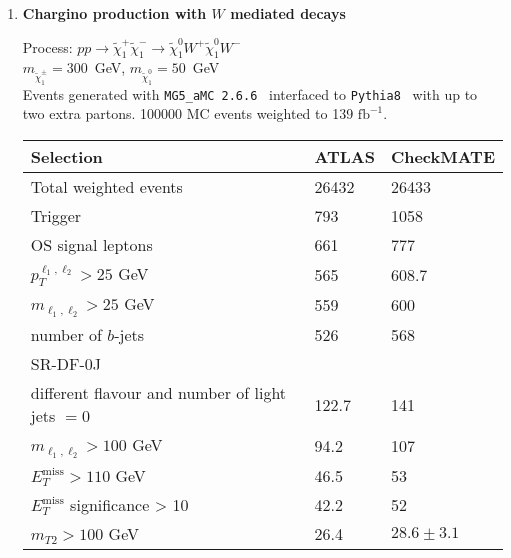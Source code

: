 \documentclass[10pt,fleqn]{article}
\newcommand{\ifb}{$\mathrm{fb}^{-1}$}
\begin{document}
\begin{enumerate}
\item{\bf Chargino production with $W$ mediated decays}

 Process: $ p p \to \tilde{\chi}^+_1 \tilde{\chi}^-_1 \to \tilde{\chi}^0_1 W^+ \tilde{\chi}^0_1 W^-$\\
 $m_{\tilde{\chi}^\pm_1} = 300$~GeV, $m_{\tilde{\chi}_1^0} = 50$~GeV\\
 Events generated with \texttt{MG5\_aMC 2.6.6}~\cite{Alwall:2014hca} interfaced to \texttt{Pythia8}~\cite{Sjostrand:2007gs} with up to two extra partons.
 100000 MC events weighted to 139 \ifb. 
 
\begin{table}[h!] \centering 
 \renewcommand*{\arraystretch}{1.2}
 \begin{tabular}{l|p{1.5cm}|p{1.5cm}} \toprule
  Selection                                                                       & ATLAS    & CheckMATE       \\ \midrule
  Total weighted events                                                           & 26432    &   26433      \\
  Trigger                                                                         &   793    &   1058\\
  OS signal leptons                                                               &   661    &    777\\
  $p_T^{\ell_1,\ell_2} > 25$ GeV                                                  &   565    &   608.7\\
  $m_{\ell_1,\ell_2} > 25  $ GeV                                                  &   559    &   600\\
  number of $b$-jets                                                              &   526    &   568\\   \midrule
  SR-DF-0J  & &\\ \midrule
  different flavour and number of light jets $=0$                                 &  122.7   &   141\\
  $m_{\ell_1,\ell_2} > 100  $ GeV                                                 &  94.2    &   107\\
  $E_T^\mathrm{miss} > 110$ GeV                                                   &  46.5    &   53\\
  $E_T^\mathrm{miss}$ significance > 10                                           &  42.2    &   52\\
  $m_{T2} >  100$ GeV                                                             &  26.4    &   $28.6 \pm 3.1$\\ \midrule   

\end{tabular}
\end{table}
\end{enumerate}
\end{document}
